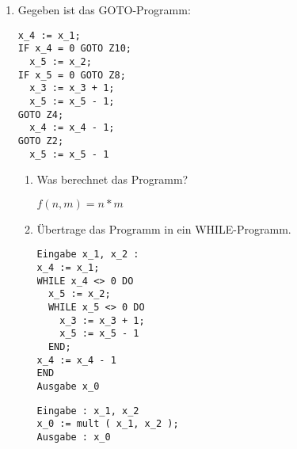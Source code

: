 \documentclass{bschlangaul-aufgabe}
\begin{document}
\begin{enumerate}

\item Gegeben ist das GOTO-Programm:

\begin{verbatim}
x_4 := x_1;
IF x_4 = 0 GOTO Z10;
  x_5 := x_2;
IF x_5 = 0 GOTO Z8;
  x_3 := x_3 + 1;
  x_5 := x_5 - 1;
GOTO Z4;
  x_4 := x_4 - 1;
GOTO Z2;
  x_5 := x_5 - 1
\end{verbatim}
\begin{enumerate}


\item Was berechnet das Programm?

\begin{bAntwort}
$f(n, m) = n * m$
\end{bAntwort}


\item Übertrage das Programm in ein WHILE-Programm.

\begin{bAntwort}
\begin{verbatim}
Eingabe x_1, x_2 :
x_4 := x_1;
WHILE x_4 <> 0 DO
  x_5 := x_2;
  WHILE x_5 <> 0 DO
    x_3 := x_3 + 1;
    x_5 := x_5 - 1
  END;
x_4 := x_4 - 1
END
Ausgabe x_0

\end{verbatim}

\begin{verbatim}
Eingabe : x_1, x_2
x_0 := mult ( x_1, x_2 );
Ausgabe : x_0
\end{verbatim}
\end{bAntwort}
\end{enumerate}

\end{enumerate}
\end{document}
